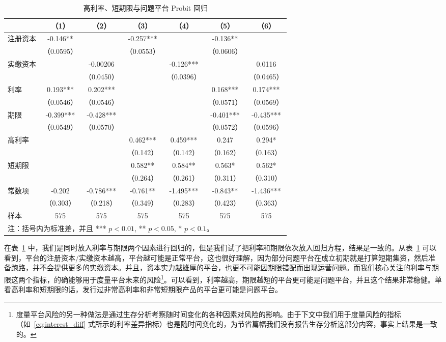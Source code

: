 \documentclass[lang=cn,11pt]{elegantpaper}
\begin{document}
\begin{table}[htbp]
\footnotesize
\centering
\caption{高利率、短期限与问题平台 Probit 回归\label{tab:probit}}
\begin{tabular}{lcccccc}
\toprule
      & （1） & （2） & （3） & （4） & （5） & （6）\\
\midrule
注册资本 & -0.146** &       & -0.257*** &       & -0.136** &  \\
      & （0.0595） &       & （0.0553） &       & （0.0606） &  \\
实缴资本 &       & -0.00206 &       & -0.126*** &       & 0.0116 \\
      &       & （0.0450） &       & （0.0396） &       & （0.0465） \\
利率 & 0.193*** & 0.202*** &       &       & 0.168*** & 0.174*** \\
      & （0.0546） & （0.0546） &       &       & （0.0571） & （0.0569） \\
期限 & -0.399*** & -0.428*** &       &       & -0.401*** & -0.435*** \\
      & （0.0549） & （0.0570） &       &       & （0.0572） & （0.0596） \\
高利率 &       &       & 0.462*** & 0.459*** & 0.247 & 0.294* \\
      &       &       & （0.142） & （0.142） & （0.162） & （0.163） \\
短期限 &       &       & 0.582** & 0.584** & 0.563* & 0.562* \\
      &       &       & （0.264） & （0.261） & （0.311） & （0.310） \\
常数项 & -0.202 & -0.786*** & -0.761** & -1.495*** & -0.843** & -1.436*** \\
      & （0.303） & （0.218） & （0.349） & （0.283） & （0.423） & （0.363） \\
样本 & 575 & 575 & 575 & 575 & 575 & 575 \\
\bottomrule
\multicolumn{6}{p{10cm}}{\scriptsize 注：括号内为标准差，并且 *** $p<0.01$, ** $p<0.05$, * $p<0.1$。}
\end{tabular}
\end{table}

在表~\ref{tab:probit} 中，我们是同时放入利率与期限两个因素进行回归的，但是我们试了把利率和期限依次放入回归方程，结果是一致的。从表~\ref{tab:probit} 可以看到，平台的注册资本/实缴资本越高，平台越可能是正常平台，这也很好理解，因为部分问题平台在成立初期就是打算短期集资，然后准备跑路，并不会提供更多的实缴资本。并且，资本实力越雄厚的平台，也更不可能因期限错配而出现运营问题。而我们核心关注的利率与期限这两个指标，的确能够用于度量平台未来的风险\footnote{度量平台风险的另一种做法是通过生存分析考察随时间变化的各种因素对风险的影响。由于下文中我们用于度量风险的指标（如~\eqref{eq:interest_diff} 式所示的利率差异指标）也是随时间变化的，为节省篇幅我们没有报告生存分析这部分内容，事实上结果是一致的。}。可以看到，利率越高，期限越短的平台更可能是问题平台，并且这个结果非常稳健。单看高利率和短期限的话，发行过非常高利率和非常短期限产品的平台更可能是问题平台。
\end{document}
